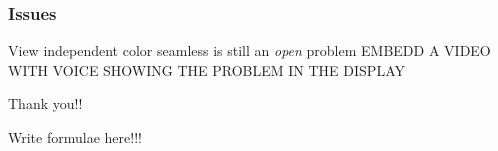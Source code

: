 \documentclass{beamer}
\begin{document}

\begin{frame}
\frametitle{Issues}
View independent color seamless is still an \textit{open} problem
EMBEDD A VIDEO WITH VOICE SHOWING THE PROBLEM IN THE DISPLAY
\end{frame}


\begin{frame}
Thank you!!
\end{frame}
\appendix
\begin{frame}[label=crossrat]
Write formulae here!!!
\end{frame}
\end{document}
